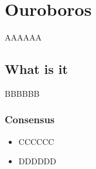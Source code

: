 \chapter{Ouroboros}

AAAAAA

\section{What is it}

BBBBBB

\subsection{Consensus}

\begin{itemize}
    \item CCCCCC
    \item DDDDDD
\end{itemize}